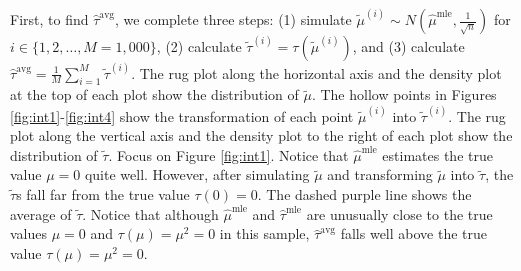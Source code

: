 \documentclass[11pt]{article}
\begin{document}
First, to find $\hat{\tau}^\text{avg}$, we complete three steps: (1) simulate $\tilde{\mu}^{(i)} \sim N \left( \hat{\mu}^\text{mle}, \frac{1}{\sqrt{n}} \right)$ for $i \in \{1, 2,\ldots, M = 1,000\}$, (2) calculate $\tilde{\tau}^{(i)} = \tau\left( \tilde{\mu}^{(i)} \right)$, and (3) calculate $\hat{\tau}^\text{avg} = \frac{1}{M} \sum_{i = 1}^M \tilde{\tau}^{(i)}$.
The rug plot along the horizontal axis and the density plot at the top of each plot show the distribution of $\tilde{\mu}$.
The hollow points in Figures \ref{fig:int1}-\ref{fig:int4} show the transformation of each point $\tilde{\mu}^{(i)}$ into $\tilde{\tau}^{(i)}$.
The rug plot along the vertical axis and the density plot to the right of each plot show the distribution of $\tilde{\tau}$.
Focus on Figure \ref{fig:int1}.
Notice that $\hat{\mu}^\text{mle}$ estimates the true value $\mu = 0$ quite well.
However, after simulating $\tilde{\mu}$ and transforming $\tilde{\mu}$ into $\tilde{\tau}$, the $\tilde{\tau}$s fall far from the true value $\tau(0) = 0$.
The dashed purple line shows the average of $\tilde{\tau}$.
Notice that although $\hat{\mu}^\text{mle}$ and $\hat{\tau}^\text{mle}$ are unusually close to the true values $\mu = 0$ and $\tau(\mu) = \mu^2 = 0$ in this sample, $\hat{\tau}^\text{avg}$ falls well above the true value $\tau(\mu) = \mu^2 = 0$.
\end{document}
